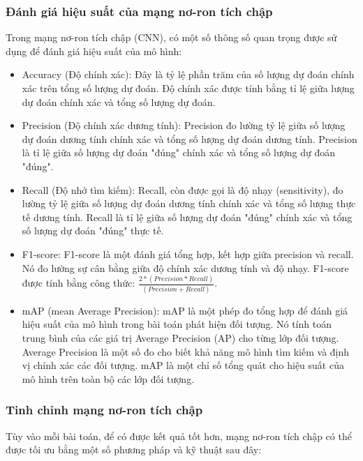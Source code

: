\subsubsection{Đánh giá hiệu suất của mạng nơ-ron tích chập}
Trong mạng nơ-ron tích chập (CNN), có một số thông số quan trọng được sử dụng để đánh giá hiệu suất của mô hình:
\begin{itemize}
    \item Accuracy (Độ chính xác): Đây là tỷ lệ phần trăm của số lượng dự đoán chính xác trên tổng số lượng dự đoán. Độ chính xác được tính bằng tỉ lệ giữa lượng dự đoán chính xác và tổng số lượng dự đoán.
    \item Precision (Độ chính xác dương tính): Precision đo lường tỷ lệ giữa số lượng dự đoán dương tính chính xác và tổng số lượng dự đoán dương tính. Precision là tỉ lệ giữa số lượng dự đoán "đúng" chính xác và tổng số lượng dự đoán "đúng".
    \item Recall (Độ nhớ tìm kiếm): Recall, còn được gọi là độ nhạy (sensitivity), đo lường tỷ lệ giữa số lượng dự đoán dương tính chính xác và tổng số lượng thực tế dương tính. Recall là tỉ lệ giữa số lượng dự đoán "đúng" chính xác và tổng số lượng dự đoán "đúng" thực tế.
    \item F1-score: F1-score là một đánh giá tổng hợp, kết hợp giữa precision và recall. Nó đo lường sự cân bằng giữa độ chính xác dương tính và độ nhạy. F1-score được tính bằng công thức: $\frac{2 * (Precision * Recall)}{(Precision + Recall)}$.
    \item mAP (mean Average Precision): mAP là một phép đo tổng hợp để đánh giá hiệu suất của mô hình trong bài toán phát hiện đối tượng. Nó tính toán trung bình của các giá trị Average Precision (AP) cho từng lớp đối tượng. Average Precision là một số đo cho biết khả năng mô hình tìm kiếm và định vị chính xác các đối tượng. mAP là một chỉ số tổng quát cho hiệu suất của mô hình trên toàn bộ các lớp đối tượng.
\end{itemize}

\subsubsection{Tinh chỉnh mạng nơ-ron tích chập}

Tùy vào mỗi bài toán, để có được kết quả tốt hơn, mạng nơ-ron tích chập có thể được tối ưu bằng một số phương pháp và kỹ thuật sau đây:

